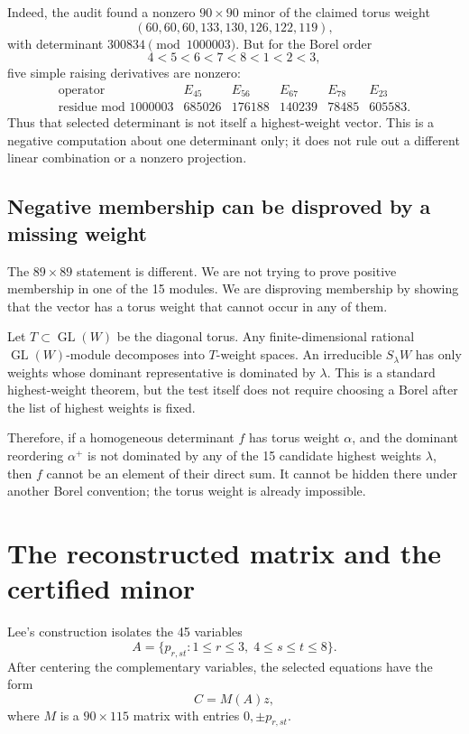 \documentclass[11pt]{article}
\newcommand{\GL}{\operatorname{GL}}
\begin{document}
Indeed, the audit found a nonzero \(90\times90\) minor of the claimed torus
weight
\[
(60,60,60,133,130,126,122,119),
\]
with determinant \(300834 \pmod {1000003}\).  But for the Borel order
\[
4<5<6<7<8<1<2<3,
\]
five simple raising derivatives are nonzero:
\[
\begin{array}{c|ccccc}
 \text{operator} & E_{45} & E_{56} & E_{67} & E_{78} & E_{23} \\
\hline
 \text{residue mod }1000003 & 685026 & 176188 & 140239 & 78485 & 605583 .
\end{array}
\]
Thus that selected determinant is not itself a highest-weight vector.  This is
a negative computation about one determinant only; it does not rule out a
different linear combination or a nonzero projection.

\subsection{Negative membership can be disproved by a missing weight}

The \(89\times89\) statement is different.  We are not trying to prove positive
membership in one of the 15 modules.  We are disproving membership by showing
that the vector has a torus weight that cannot occur in any of them.

Let \(T\subset\GL(W)\) be the diagonal torus.  Any finite-dimensional rational
\(\GL(W)\)-module decomposes into \(T\)-weight spaces.  An irreducible
\(S_\lambda W\) has only weights whose dominant representative is dominated by
\(\lambda\).  This is a standard highest-weight theorem, but the test itself
does not require choosing a Borel after the list of highest weights is fixed.

Therefore, if a homogeneous determinant \(f\) has torus weight \(\alpha\), and
the dominant reordering \(\alpha^+\) is not dominated by any of the 15
candidate highest weights \(\lambda\), then \(f\) cannot be an element of their
direct sum.  It cannot be hidden there under another Borel convention; the
torus weight is already impossible.

\section{The reconstructed matrix and the certified minor}

Lee's construction isolates the 45 variables
\[
 A=\{p_{r,st}:1\le r\le3,\;4\le s\le t\le8\}.
\]
After centering the complementary variables, the selected equations have the
form
\[
 C=M(A)z,
\]
where \(M\) is a \(90\times115\) matrix with entries \(0,\pm p_{r,st}\).
\end{document}
